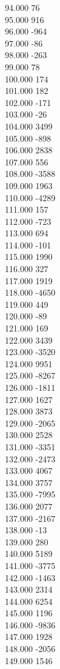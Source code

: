 { 94.000	76 \\
 95.000	916 \\
 96.000	-964 \\
 97.000	-86 \\
 98.000	-263 \\
 99.000	78 \\
 100.000	174 \\
 101.000	182 \\
 102.000	-171 \\
 103.000	-26 \\
 104.000	3499 \\
 105.000	-898 \\
 106.000	2838 \\
 107.000	556 \\
 108.000	-3588 \\
 109.000	1963 \\
 110.000	-4289 \\
 111.000	157 \\
 112.000	-723 \\
 113.000	694 \\
 114.000	-101 \\
 115.000	1990 \\
 116.000	327 \\
 117.000	1919 \\
 118.000	-4650 \\
 119.000	449 \\
 120.000	-89 \\
 121.000	169 \\
 122.000	3439 \\
 123.000	-3520 \\
 124.000	9951 \\
 125.000	-8267 \\
 126.000	-1811 \\
 127.000	1627 \\
 128.000	3873 \\
 129.000	-2065 \\
 130.000	2528 \\
 131.000	-3351 \\
 132.000	-2473 \\
 133.000	4067 \\
 134.000	3757 \\
 135.000	-7995 \\
 136.000	2077 \\
 137.000	-2167 \\
 138.000	-13 \\
 139.000	280 \\
 140.000	5189 \\
 141.000	-3775 \\
 142.000	-1463 \\
 143.000	2314 \\
 144.000	6254 \\
 145.000	1196 \\
 146.000	-9836 \\
 147.000	1928 \\
 148.000	-2056 \\
 149.000	1546 \\
}
